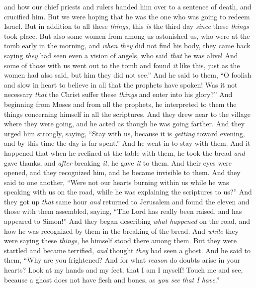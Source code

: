 \begin{biblechapter}
\verse and how our chief priests and rulers handed him over to a sentence of death, and crucified him.
\verse But we were hoping that he was the one who was going to redeem Israel. But in addition to all these \textit{things}, this \textit{is} the third day \textit{since} these \textit{things} took place.
\verse But also some women from among us astonished us, who were at the tomb early in the morning,
\verse and \textit{when they} did not find his body, they came back saying \textit{they} had seen even a vision of angels, who said \textit{that} he was alive!
\verse And some of those with us went out to the tomb and found \textit{it} like this, just as the women had also said, but him they did not see.”
\verse And he said to them, “O foolish and slow in heart to believe in all that the prophets have spoken!
\verse Was it not necessary \textit{that} the Christ suffer these \textit{things} and enter into his glory?”
\verse And beginning from Moses and from all the prophets, he interpreted to them the things concerning himself in all the scriptures.
\verse And they drew near to the village where they were going, and he acted as though he was going farther.
\verse And they urged him strongly, saying, “Stay with us, because it is \textit{getting} toward evening, and by this time the day is far spent.” And he went in to stay with them.
\verse And it happened that when he reclined at the table with them, he took the bread \textit{and} gave thanks, and \textit{after} breaking \textit{it}, he gave \textit{it} to them.
\verse And their eyes were opened, and they recognized him, and he became invisible to them.
\verse And they said to one another, “Were not our hearts burning within us while he was speaking with us on the road, while he was explaining the scriptures to us?”
\verse And they got up \textit{that} same hour \textit{and} returned to Jerusalem and found the eleven and those with them assembled,
\verse saying, “The Lord has really been raised, and has appeared to Simon!”
\verse And they began describing \textit{what happened} on the road, and how he was recognized by them in the breaking of the bread.
 And \textit{while} they were saying these \textit{things}, he himself stood there among them.
\verse But they were startled and became terrified, \textit{and} thought \textit{they} had seen a ghost.
\verse And he said to them, “Why are you frightened? And for what \textit{reason} do doubts arise in your hearts?
\verse Look at my hands and my feet, that I am I myself! Touch me and see, because a ghost does not have flesh and bones, as \textit{you see that I have}.”

\end{biblechapter}
